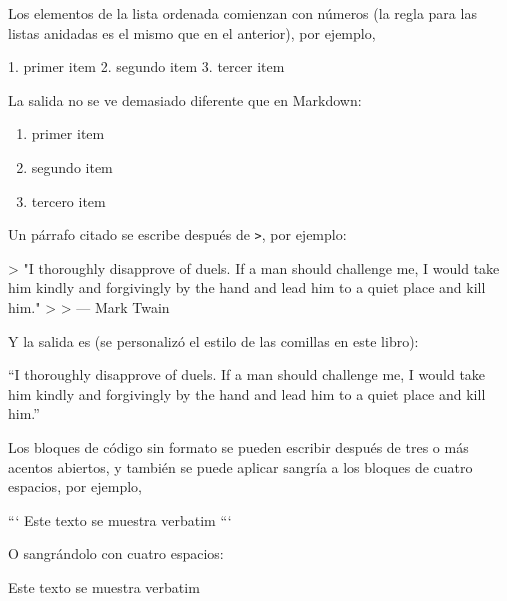 \documentclass[12pt,]{krantz}
\makeatletter
\newenvironment{Shaded}{\begin{snugshade}}{\end{snugshade}}
\newcommand{\DataTypeTok}[1]{\textcolor[rgb]{0.13,0.29,0.53}{#1}}
\newcommand{\BaseNTok}[1]{\textcolor[rgb]{0.00,0.00,0.81}{#1}}
\newcommand{\FloatTok}[1]{\textcolor[rgb]{0.00,0.00,0.81}{#1}}
\newcommand{\NormalTok}[1]{#1}
\providecommand{\tightlist}{%
  \setlength{\itemsep}{0pt}\setlength{\parskip}{0pt}}
\renewenvironment{quote}{\begin{VF}}{\end{VF}}
\newenvironment{kframe}{%
\medskip{}
\setlength{\fboxsep}{.8em}
 \def\at@end@of@kframe{}%
 \ifinner\ifhmode%
  \def\at@end@of@kframe{\end{minipage}}%
  \begin{minipage}{\columnwidth}%
 \fi\fi%
 \def\FrameCommand##1{\hskip\@totalleftmargin \hskip-\fboxsep
 \colorbox{shadecolor}{##1}\hskip-\fboxsep
     \hskip-\linewidth \hskip-\@totalleftmargin \hskip\columnwidth}%
 \MakeFramed {\advance\hsize-\width
   \@totalleftmargin\z@ \linewidth\hsize
   \@setminipage}}%
 {\par\unskip\endMakeFramed%
 \at@end@of@kframe}
\renewenvironment{Shaded}{\begin{kframe}}{\end{kframe}}
\theoremstyle{definition}
\theoremstyle{definition}
\theoremstyle{definition}
\theoremstyle{remark}
\makeatother
\begin{document}
Los elementos de la lista ordenada comienzan con números (la regla para
las listas anidadas es el mismo que en el anterior), por ejemplo,

\begin{Shaded}
\begin{Highlighting}[]
\NormalTok{1. }\FloatTok{primer item}
\FloatTok{2. segundo item}
\FloatTok{3. tercer item}
\end{Highlighting}
\end{Shaded}

La salida no se ve demasiado diferente que en Markdown:

\begin{enumerate}
\def\labelenumi{\arabic{enumi}.}
\tightlist
\item
  primer item
\item
  segundo item
\item
  tercero item
\end{enumerate}

Un párrafo citado se escribe después de \texttt{\textgreater{}}, por
ejemplo:

\begin{Shaded}
\begin{Highlighting}[]
\NormalTok{>}\DataTypeTok{ "I thoroughly disapprove of duels. If a man should challenge me,}
\DataTypeTok{  I would take him kindly and forgivingly by the hand and lead him}
\DataTypeTok{  to a quiet place and kill him."}
\DataTypeTok{>}
\DataTypeTok{> --- Mark Twain}
\end{Highlighting}
\end{Shaded}

Y la salida es (se personalizó el estilo de las comillas en este libro):

\begin{quote}
``I thoroughly disapprove of duels. If a man should challenge me, I
would take him kindly and forgivingly by the hand and lead him to a
quiet place and kill him.''

\end{quote}

Los bloques de código sin formato se pueden escribir después de tres o
más acentos abiertos, y también se puede aplicar sangría a los bloques
de cuatro espacios, por ejemplo,

\begin{Shaded}
\begin{Highlighting}[]
\NormalTok{```}
\NormalTok{Este texto se muestra verbatim}
\NormalTok{```}

\NormalTok{O sangrándolo con cuatro espacios:}

\BaseNTok{    Este texto se muestra verbatim}
\end{Highlighting}
\end{Shaded}
\end{document}
